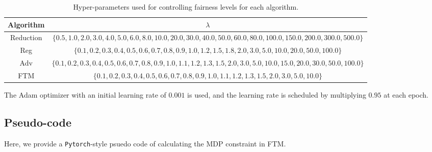 \documentclass[10pt]{article} %
\begin{document}
\begin{table}[ht]
    \footnotesize
    \centering
    \caption{Hyper-parameters used for controlling fairness levels for each algorithm.}
    \begin{tabular}{c||c}
        \toprule
        Algorithm & $\lambda$ \\
        \midrule
        Reduction & 
        \footnotesize $\{0.5, 1.0, 2.0, 3.0, 4.0, 5.0, 6.0, 8.0, 10.0, 20.0, 30.0, 40.0, 50.0, 60.0, 80.0, 100.0, 150.0, 200.0, 300.0, 500.0\}$
        \\
        Reg & 
        \footnotesize $\{0.1, 0.2, 0.3, 0.4, 0.5, 0.6, 0.7, 0.8, 0.9, 1.0, 1.2, 1.5, 1.8, 2.0, 3.0, 5.0, 10.0, 20.0, 50.0, 100.0\}$
        \\
        Adv & 
        \footnotesize $\{0.1, 0.2, 0.3, 0.4, 0.5, 0.6, 0.7, 0.8, 0.9, 1.0, 1.1, 1.2, 1.3, 1.5, 2.0, 3.0, 5.0, 10.0, 15.0, 20.0, 30.0, 50.0, 100.0\}$
        \\
        FTM & 
        \footnotesize $\{0.1, 0.2, 0.3, 0.4, 0.5, 0.6, 0.7, 0.8, 0.9, 1.0, 1.1, 1.2, 1.3, 1.5, 2.0, 3.0, 5.0, 10.0\}$
        \\
        \bottomrule
    \end{tabular}
\end{table}

The Adam optimizer \citep{https://doi.org/10.48550/arxiv.1412.6980} with an initial learning rate of $0.001$ is used, and the learning rate is scheduled by multiplying $0.95$ at each epoch.



\subsection{Pseudo-code}\label{sec:code-appendix}

\newcommand{\PyComment}[1]{\ttfamily\textcolor{commentcolor}{\# #1}}  %
\newcommand{\PyCode}[1]{\ttfamily\textcolor{black}{#1}} %

Here, we provide a \texttt{Pytorch}-style psuedo code of calculating the MDP constraint in FTM.
\end{document}
